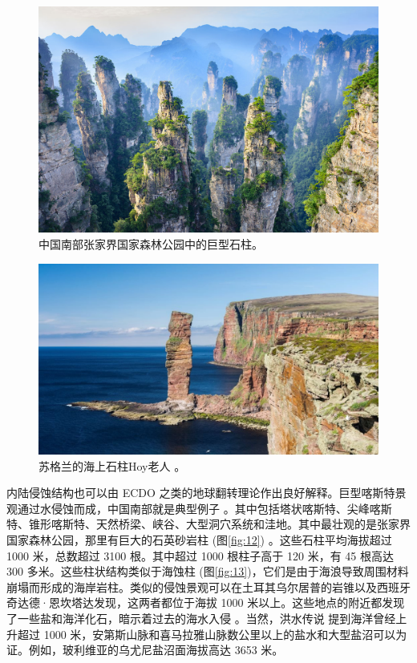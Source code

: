 \documentclass[10pt,twocolumn,letterpaper]{article}
\begin{document}
\begin{figure}[b]
\begin{center}
   \includegraphics[width=1\linewidth]{zhangjiajie.jpg}
\end{center}
   \caption{中国南部张家界国家森林公园中的巨型石柱。}
\label{fig:12}
\label{fig:onecol}
\end{figure}

\begin{figure}[t]
\begin{center}
   \includegraphics[width=1\linewidth]{hoy.jpg}
\end{center}
   \caption{苏格兰的海上石柱Hoy老人 \cite{83}。}
\label{fig:13}
\label{fig:onecol}
\end{figure}

内陆侵蚀结构也可以由 ECDO 之类的地球翻转理论作出良好解释。巨型喀斯特景观通过水侵蚀而成，中国南部就是典型例子 \cite{82}。其中包括塔状喀斯特、尖峰喀斯特、锥形喀斯特、天然桥梁、峡谷、大型洞穴系统和洼地。其中最壮观的是张家界国家森林公园，那里有巨大的石英砂岩柱 (图\ref{fig:12}) \cite{84}。这些石柱平均海拔超过 1000 米，总数超过 3100 根。其中超过 1000 根柱子高于 120 米，有 45 根高达 300 多米\cite{85}。这些柱状结构类似于海蚀柱 (图\ref{fig:13})，它们是由于海浪导致周围材料崩塌而形成的海岸岩柱。类似的侵蚀景观可以在土耳其乌尔居普的岩锥以及西班牙奇达德·恩坎塔达发现，这两者都位于海拔 1000 米以上。这些地点的附近都发现了一些盐和海洋化石，暗示着过去的海水入侵 \cite{15,86,87}。当然，洪水传说 \cite{3} 提到海洋曾经上升超过 1000 米，安第斯山脉和喜马拉雅山脉数公里以上的盐水和大型盐沼可以为证。例如，玻利维亚的乌尤尼盐沼面海拔高达 3653 米\cite{94}。
\end{document}
